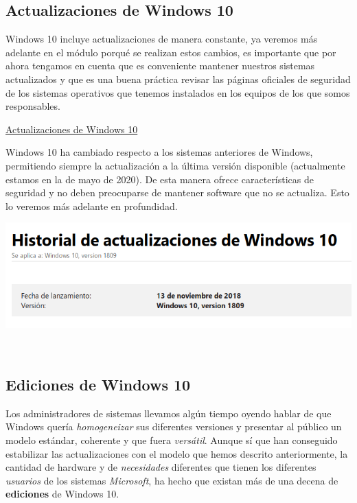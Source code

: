 \documentclass[11pt]{article}
\begin{document}
\subsection{Actualizaciones de Windows 10}
\label{sec:org8a465b7}
Windows 10 incluye actualizaciones de manera constante, ya veremos más
adelante en el módulo porqué se realizan estos cambios, es importante
que por ahora tengamos en cuenta que es conveniente mantener nuestros
sistemas actualizados y que es una buena práctica revisar las páginas
oficiales de seguridad de los sistemas operativos que tenemos instalados
en los equipos de los que somos responsables.

\href{https://support.microsoft.com/es-es/help/4464619/windows-10-update-history}{Actualizaciones
de Windows 10}

Windows 10 ha cambiado respecto a los sistemas anteriores de Windows,
permitiendo siempre la actualización a la última versión disponible
(actualmente estamos en la de mayo de 2020). De esta manera ofrece características
de seguridad y no deben preocuparse de mantener software que no se
actualiza. Esto lo veremos más adelante en profundidad.

\begin{center}
\includegraphics[width=.9\linewidth]{Versiones/windows10-1809.png}
\end{center}  

\subsection{Ediciones de Windows 10}
\label{sec:org5e5f7eb}

Los administradores de sistemas llevamos algún tiempo oyendo hablar de que Windows
quería \emph{homogeneizar} sus diferentes versiones y presentar al público un modelo estándar,
coherente y que fuera \emph{versátil}. Aunque sí que han conseguido estabilizar las actualizaciones
con el modelo que hemos descrito anteriormente, la cantidad de hardware y de \emph{necesidades} diferentes
que tienen los diferentes \emph{usuarios} de los sistemas \emph{Microsoft}, ha hecho que existan más de una decena 
de \textbf{ediciones} de Windows 10.
\end{document}
